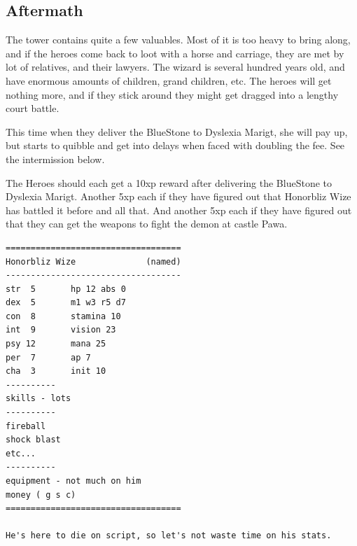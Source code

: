 \subsection*{Aftermath}
The tower contains quite a few valuables. Most of it is too heavy to bring along, and if the heroes come back to loot with a horse and carriage, they are met by lot of relatives, and their lawyers. The wizard is several hundred years old, and have enormous amounts of children, grand children, etc. The heroes will get nothing more, and if they stick around they might get dragged into a lengthy court battle.

This time when they deliver the BlueStone to Dyslexia Marigt, she will pay up, but starts to quibble and get into delays when faced with doubling the fee. See the intermission below.

The Heroes should each get a 10xp reward after delivering the BlueStone to Dyslexia Marigt. Another 5xp each if they have figured out that Honorbliz Wize has battled it before and all that. And another 5xp each if they have figured out that they can get the weapons to fight the demon at castle Pawa.


\raggedbottom  %

\goodbreak \begin{samepage} \vsmall \begin{verbatim}
===================================
Honorbliz Wize              (named)
-----------------------------------
str  5       hp 12 abs 0
dex  5       m1 w3 r5 d7
con  8       stamina 10
int  9       vision 23
psy 12       mana 25
per  7       ap 7
cha  3       init 10
----------
skills - lots
----------
fireball
shock blast
etc...
----------
equipment - not much on him
money ( g s c)
===================================

He's here to die on script, so let's not waste time on his stats.
\end{verbatim} \normalsize \end{samepage}

\

